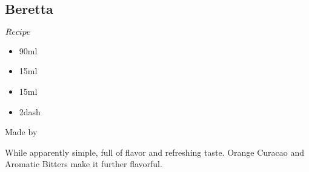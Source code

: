 \subsection{Beretta}
\begin{itembox}[l]{\boldmath $Recipe$}
\begin{itemize}
\setlength{\parskip}{0cm}
\setlength{\itemsep}{0cm}
\item \ww 90ml
\item \gin 15ml
\item \oc 15ml
\item \ab 2dash
\end{itemize}
\vspace{-4mm}
Made by \stir
\end{itembox}
While apparently simple, full of flavor and refreshing taste.
Orange Curacao and Aromatic Bitters make it further flavorful.
